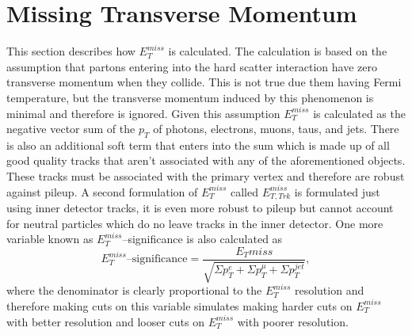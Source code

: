 \section{Missing Transverse Momentum}
\label{sec:met}
This section describes how $E_T^{miss}$ is calculated. The calculation is based
on the assumption that partons entering into the hard scatter interaction have
zero transverse momentum when they collide. This is not true due them having
Fermi temperature, but the transverse momentum induced by this phenomenon is
minimal and therefore is ignored. Given this assumption $E_T^{miss}$ is
calculated as the negative vector sum of the $p_T$ of photons, electrons, muons,
taus, and jets. There is also an additional soft term that enters into the sum
which is made up of all good quality tracks that aren't associated with any of
the aforementioned objects. These tracks must be associated with the primary
vertex and therefore are robust against pileup. A second formulation of
$E_T^{miss}$ called $E_{T, Trk}^{miss}$ is formulated just using inner detector
tracks, it is even more robust to pileup but cannot account for neutral
particles which do no leave tracks in the inner detector. One more variable
known as $E_T^{miss}$--significance is also calculated as
\begin{equation}
  E_T^{miss}\text{--significance} = \frac{E_T{miss}}{\sqrt{\Sigma p_T^e + \Sigma p_T^\mu + \Sigma p_T^{jet}}},
  \label{eq:metsig}
\end{equation}
where the denominator is clearly proportional to the $E_T^{miss}$ resolution and
therefore making cuts on this variable simulates making harder cuts on
$E_T^{miss}$ with better resolution and looser cuts on $E_T^{miss}$ with poorer
resolution.

